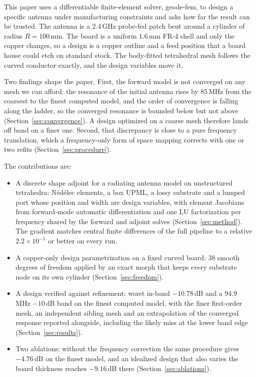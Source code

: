 \documentclass{anvil-paper}
\begin{document}
This paper uses a differentiable finite-element solver, geode-fem, to
design a specific antenna under manufacturing constraints and asks how far
the result can be trusted. The antenna is a 2.4\,GHz probe-fed patch bent
around a cylinder of radius $R = 100$\,mm. The board is a uniform
$1.6$\,mm FR-4 shell and only the copper changes, so a design is a copper
outline and a feed position that a board house could etch on standard
stock. The body-fitted tetrahedral mesh follows the curved conductor
exactly, and the design variables move it.

Two findings shape the paper. First, the forward model is not converged on
any mesh we can afford: the resonance of the initial antenna rises by
$85$\,MHz from the coarsest to the finest computed model, and the order of
convergence is falling along the ladder, so the converged resonance is
bounded below but not above (Section~\ref{sec:convergence}). A design
optimized on a coarse mesh therefore lands off band on a finer one.
Second, that discrepancy is close to a pure frequency translation, which a
frequency-only form of space mapping \citep{bandler1994space,bandler2004space}
corrects with one or two refits (Section~\ref{sec:procedure}).

The contributions are:
\begin{itemize}
  \item A discrete shape adjoint for a radiating antenna model on
  unstructured tetrahedra: N\'ed\'elec elements, a box UPML, a lossy
  substrate and a lumped port whose position and width are design
  variables, with element Jacobians from forward-mode automatic
  differentiation and one LU factorization per frequency shared by the
  forward and adjoint solves (Section~\ref{sec:method}). The gradient
  matches central finite differences of the full pipeline to a relative
  $2.2\times10^{-5}$ or better on every run.
  \item A copper-only design parametrization on a fixed curved board:
  $38$ smooth degrees of freedom applied by an exact morph that keeps every
  substrate node on its own cylinder (Section~\ref{sec:freedom}).
  \item A design verified against refinement: worst in-band $-10.78$\,dB
  and a $94.9$\,MHz $-10$\,dB band on the finest computed model, with the
  finer first-order mesh, an independent sibling mesh and an extrapolation
  of the converged response reported alongside, including the likely miss
  at the lower band edge (Section~\ref{sec:results}).
  \item Two ablations: without the frequency correction the same procedure
  gives $-4.76$\,dB on the finest model, and an idealized design that also
  varies the board thickness reaches $-9.16$\,dB there
  (Section~\ref{sec:ablations}).
\end{itemize}
\end{document}
